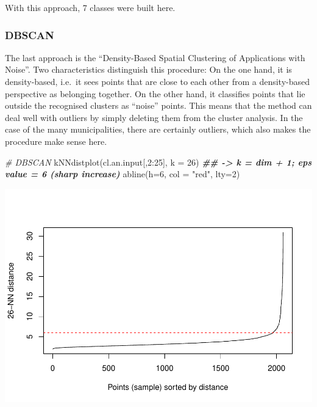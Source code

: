 \documentclass[
]{article}
\newenvironment{Shaded}{\begin{snugshade}}{\end{snugshade}}
\newcommand{\AttributeTok}[1]{\textcolor[rgb]{0.77,0.63,0.00}{#1}}
\newcommand{\CommentTok}[1]{\textcolor[rgb]{0.56,0.35,0.01}{\textit{#1}}}
\newcommand{\DecValTok}[1]{\textcolor[rgb]{0.00,0.00,0.81}{#1}}
\newcommand{\DocumentationTok}[1]{\textcolor[rgb]{0.56,0.35,0.01}{\textbf{\textit{#1}}}}
\newcommand{\FunctionTok}[1]{\textcolor[rgb]{0.00,0.00,0.00}{#1}}
\newcommand{\NormalTok}[1]{#1}
\newcommand{\SpecialCharTok}[1]{\textcolor[rgb]{0.00,0.00,0.00}{#1}}
\newcommand{\StringTok}[1]{\textcolor[rgb]{0.31,0.60,0.02}{#1}}
\begin{document}
With this approach, 7 classes were built here.

\hypertarget{dbscan}{%
\subsubsection{DBSCAN}\label{dbscan}}

The last approach is the ``Density-Based Spatial Clustering of
Applications with Noise''. Two characteristics distinguish this
procedure: On the one hand, it is density-based, i.e.~it sees points
that are close to each other from a density-based perspective as
belonging together. On the other hand, it classifies points that lie
outside the recognised clusters as ``noise'' points. This means that the
method can deal well with outliers by simply deleting them from the
cluster analysis. In the case of the many municipalities, there are
certainly outliers, which also makes the procedure make sense here.

\begin{Shaded}
\begin{Highlighting}[]
\CommentTok{\# DBSCAN}
\FunctionTok{kNNdistplot}\NormalTok{(cl.an.input[,}\DecValTok{2}\SpecialCharTok{:}\DecValTok{25}\NormalTok{], }\AttributeTok{k =} \DecValTok{26}\NormalTok{) }\DocumentationTok{\#\# {-}\textgreater{} k = dim + 1; eps value = 6 (sharp increase)}
\FunctionTok{abline}\NormalTok{(}\AttributeTok{h=}\DecValTok{6}\NormalTok{, }\AttributeTok{col =} \StringTok{"red"}\NormalTok{, }\AttributeTok{lty=}\DecValTok{2}\NormalTok{)}
\end{Highlighting}
\end{Shaded}

\includegraphics{Influence_factors_files/figure-latex/3.09_dbscan1_munic-1.pdf}
\end{document}

